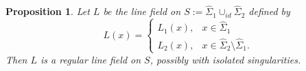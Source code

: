 \documentclass[11pt,reqno]{amsart}
\newtheorem{proposition}[theorem]{Proposition}
\begin{document}
\begin{proposition}\label{prop:hipoteseshopf}
    Let $L$ be the line field on $S:=\widehat{\Sigma}_1\cup_{id}\widehat{\Sigma}_2$ defined by
    \begin{equation}
        L(x)=\begin{cases}
            L_1(x), & x\in \widehat{\Sigma}_1 \\ L_2(x), & x\in \widehat{\Sigma}_2\setminus \widehat{\Sigma}_1.
        \end{cases}
    \end{equation}
    Then $L$ is a regular line field on $S$, possibly with isolated singularities.
\end{proposition}
\end{document}
